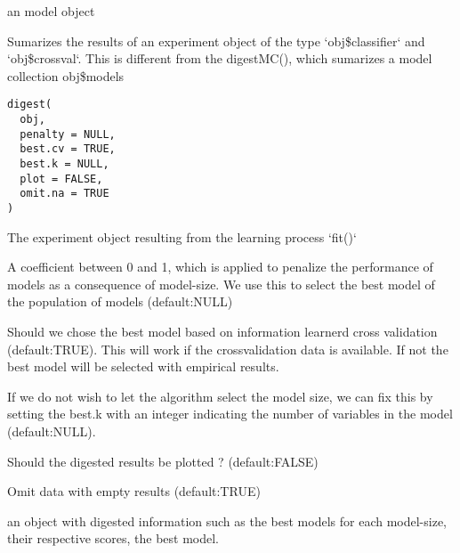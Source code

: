 \documentclass[a4paper]{book}
\begin{document}
%
\begin{Value}
an model object
\end{Value}
%
\begin{Description}
Sumarizes the results of an experiment object of the type 
`obj\$classifier` and `obj\$crossval`. This is different from the digestMC(),
which sumarizes a model collection obj\$models
\end{Description}
%
\begin{Usage}
\begin{verbatim}
digest(
  obj,
  penalty = NULL,
  best.cv = TRUE,
  best.k = NULL,
  plot = FALSE,
  omit.na = TRUE
)
\end{verbatim}
\end{Usage}
%
\begin{Arguments}
\begin{ldescription}
\item[\code{obj:}] The experiment object resulting from the learning process `fit()`

\item[\code{penalty:}] A coefficient between 0 and 1, which is applied to penalize 
the performance of models as a consequence of model-size. We use this to select
the best model of the population of models (default:NULL)

\item[\code{best.cv:}] Should we chose the best model based on information learnerd 
cross validation (default:TRUE). This will work if the crossvalidation data is 
available. If not the best model will be selected with empirical results.

\item[\code{best.k:}] If we do not wish to let the algorithm select the model size, 
we can fix this by setting the best.k with an integer indicating the number of 
variables in the model (default:NULL).

\item[\code{plot:}] Should the digested results be plotted ? (default:FALSE)

\item[\code{omit.na:}] Omit data with empty results (default:TRUE)
\end{ldescription}
\end{Arguments}
%
\begin{Value}
an object with digested information such as the best models for each 
model-size, their respective scores, the best model.
\end{Value}
\end{document}
